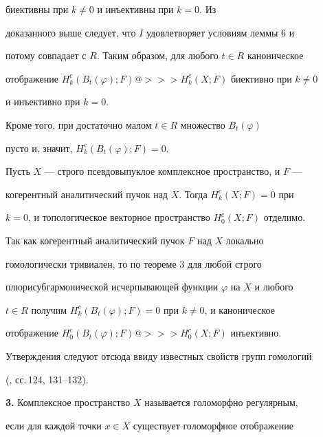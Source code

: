 \begin{pf}
биективны при $k\ne 0$ и инъективны при $k=0$. Из 


доказанного выше следует, что $I$ удовлетворяет условиям леммы 6 и 


потому совпадает с $R$. Таким образом, для любого $t\in R$ каноническое 


отображение $H^c_k(B_t(\varphi);F)@>>>H^c_k(X;F)$ биективно при $k\ne0$ 


и инъективно при $k=0$. 


Кроме того, при достаточно малом $t\in R$ множество $B_t(\varphi)$ 


пусто и, значит, $H^c_k(B_t(\varphi);F)=0$. 


\end{pf} 


 


\begin{lem} 


Пусть $X$ --- строго псевдовыпуклое комплексное пространство, и $F$ --- 


когерентный аналитический пучок над $X$. Тогда $H^c_k(X;F)=0$ при 


$k=0$, и топологическое векторное пространство $H^c_0(X;F)$ отделимо. 


\end{lem} 


 


\begin{pf} 


Так как когерентный аналитический пучок $F$ над $X$ локально 


гомологически тривиален, то по теореме 3 для любой строго 


плюрисубгармонической исчерпывающей функции $\varphi$ на $X$ и любого 


$t\in R$ получим $H^c_k(B_t(\varphi);F)=0$ при $k\ne 0$, и каноническое 


отображение $H^c_0(B_t(\varphi);F)@>>>H^c_0(X;F)$ инъективно. 


Утверждения следуют отсюда ввиду известных свойств групп гомологий 


(\cite{1}, сс.\,124, 131--132). 


\end{pf} 


 


{\bf 3.} Комплексное пространство $X$ называется голоморфно регулярным, 


если для каждой точки $x\in X$ существует голоморфное отображение 


